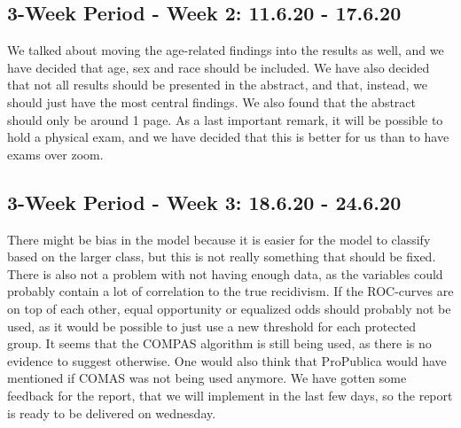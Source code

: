 \documentclass[11pt, fleqn]{article}
\begin{document}
\subsection*{3-Week Period - Week 2: 11.6.20 - 17.6.20}
We talked about moving the age-related findings into the results as well, and we have decided that age, sex and race should be included. We have also decided that not all results should be presented in the abstract, and that, instead, we should just have the most central findings. We also found that the abstract should only be around 1 page. As a last important remark, it will be possible to hold a physical exam, and we have decided that this is better for us than to have exams over zoom.


\subsection*{3-Week Period - Week 3: 18.6.20 - 24.6.20}
There might be bias in the model because it is easier for the model to classify based on the larger class, but this is not really something that should be fixed. There is also not a problem with not having enough data, as the variables could probably contain a lot of correlation to the true recidivism. If the ROC-curves are on top of each other, equal opportunity or equalized odds should probably not be used, as it would be possible to just use a new threshold for each protected group.
It seems that the COMPAS algorithm is still being used, as there is no evidence to suggest otherwise. One would also think that ProPublica would have mentioned if COMAS was not being used anymore. We have gotten some feedback for the report, that we will implement in the last few days, so the report is ready to be delivered on wednesday.
	
\end{document}
